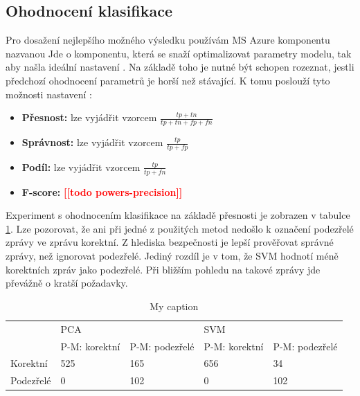 \documentclass[thesis=M,czech]{FITthesis}[2012/10/20]
\newcommand{\todo}[1]{\textcolor{red}{\textbf{[[#1]]}}}
\begin{document}
		\subsection{Ohodnocení klasifikace}
			\label{subsec:classification_performance}
			Pro dosažení nejlepšího možného výsledku používám MS Azure komponentu nazvanou  Jde o komponentu, která se snaží optimalizovat parametry modelu, tak aby našla ideální nastavení \cite{msAzure}. Na základě toho je nutné být schopen rozeznat, jestli předchozí ohodnocení parametrů je horší než stávající. K tomu poslouží tyto možnosti nastavení \cite{powers-precision}:
			
			\begin{itemize} 
				\item \textbf{Přesnost: }  lze vyjádřit vzorcem $\frac{tp+tn}{tp+tn+fp+fn}$
				\item \textbf{Správnost: } lze vyjádřit vzorcem $\frac{tp}{tp+fp}$
				\item \textbf{Podíl: } lze vyjádřit vzorcem $\frac{tp}{tp+fn}$
				\item \textbf{F-score: } \todo{todo powers-precision}				
			\end{itemize}
		
			Experiment s ohodnocením klasifikace na základě přesnosti je zobrazen v tabulce \ref{table:anomaly_accuracy}. Lze pozorovat, že ani při jedné z použitých metod nedošlo k označení podezřelé zprávy ve zprávu korektní. Z hlediska bezpečnosti je lepší prověřovat správné zprávy, než ignorovat podezřelé. Jediný rozdíl je v tom, že SVM hodnotí méně korektních zpráv jako podezřelé. Při bližším pohledu na takové zprávy jde převážně o kratší požadavky.
			
			\begin{table}[htb]\centering
				\centering
				\caption{My caption}
				\label{table:anomaly_accuracy}
				\begin{tabular}{|l|l|l|l|l|}
					\hline
					\multirow{2}{*}{} & \multicolumn{2}{l|}{PCA}                 & \multicolumn{2}{l|}{SVM}                 \\ 
					& P-M: korektní & P-M: podezřelé & P-M: korektní & P-M: podezřelé \\ \hline
					Korektní          & 525                & 165                 & 656                & 34                  \\ \hline
					Podezřelé         & 0                  & 102                 & 0                  & 102                 \\ \hline
				\end{tabular}
			\end{table}
		
\end{document}
